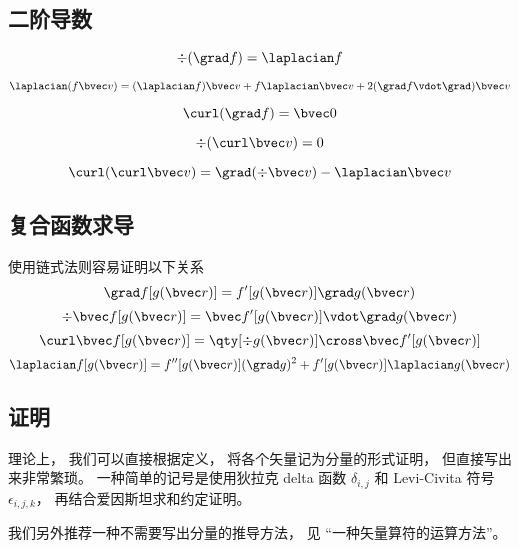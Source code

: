 \subsection{二阶导数}

\begin{equation}
\div (\grad f) = \laplacian f
\end{equation}

\begin{equation}\label{eq_VopEq_5}
\laplacian (f \bvec v) = (\laplacian f)\bvec v + f \laplacian \bvec v + 2 (\grad f \vdot \grad) \bvec v
\end{equation}

\begin{equation}
\curl (\grad f) = \bvec 0
\end{equation}

\begin{equation}
\div (\curl \bvec v) = 0
\end{equation}

\begin{equation}\label{eq_VopEq_7}
\curl(\curl \bvec v) = \grad(\div\bvec v) - \laplacian \bvec v
\end{equation}

\subsection{复合函数求导}
使用链式法则容易证明以下关系
\begin{equation}
\grad f[g(\bvec r)] = f'[g(\bvec r)] \grad g(\bvec r)
\end{equation}
\begin{equation}
\div \bvec f[g(\bvec r)] = \bvec f'[g(\bvec r)] \vdot \grad g(\bvec r)
\end{equation}
\begin{equation}
\curl \bvec f[g(\bvec r)] = \qty[\div g(\bvec r)] \cross \bvec f'[g(\bvec r)]
\end{equation}
\begin{equation}
\laplacian f[g(\bvec r)] = f''[g(\bvec r)] (\grad g)^2 + f'[g(\bvec r)] \laplacian g(\bvec r)
\end{equation}

\subsection{证明}
理论上， 我们可以直接根据定义， 将各个矢量记为分量的形式证明， 但直接写出来非常繁琐。 一种简单的记号是使用狄拉克 delta 函数 $\delta_{i,j}$ 和 Levi-Civita 符号 $\epsilon_{i,j,k}$， 再结合爱因斯坦求和约定证明。

我们另外推荐一种不需要写出分量的推导方法， 见 “一种矢量算符的运算方法”。
